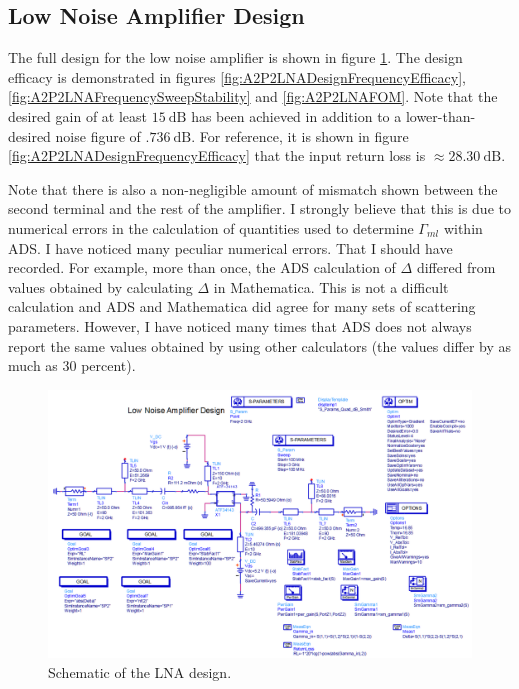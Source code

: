 \subsection{Low Noise Amplifier Design}

The full design for the low noise amplifier is shown in figure
\ref{fig:A2P2LNASchematic}. The design efficacy is demonstrated in figures
\ref{fig:A2P2LNADesignFrequencyEfficacy},
\ref{fig:A2P2LNAFrequencySweepStability} and \ref{fig:A2P2LNAFOM}. Note that the
desired gain of at least $\SI{15}{\deci\bel}$ has been achieved in addition to a
lower-than-desired noise figure of $\SI{.736}{\deci\bel}$. For reference, it is
shown in figure \ref{fig:A2P2LNADesignFrequencyEfficacy} that the input return
loss is $\approx \SI{28.30}{\deci\bel}$.

Note that there is also a non-negligible amount of mismatch shown between the
second terminal and the rest of the amplifier. I strongly believe that this is
due to numerical errors in the calculation of quantities used to determine
$\Gamma_{ml}$ within ADS. I have noticed many peculiar numerical errors. That I
should have recorded. For example, more than once, the ADS calculation of
$\Delta$ differed from values obtained by calculating $\Delta$ in Mathematica.
This is not a difficult calculation and ADS and Mathematica did agree for many
sets of scattering parameters. However, I have noticed many times that ADS does
not always report the same values obtained by using other calculators (the
values differ by as much as 30 percent).

\begin{figure}[H]
    \centering
    \includegraphics[width=0.8\linewidth]{Images/A2P2LNASchematic.png}
    \caption{Schematic of the LNA design.}
    \label{fig:A2P2LNASchematic}
\end{figure}

